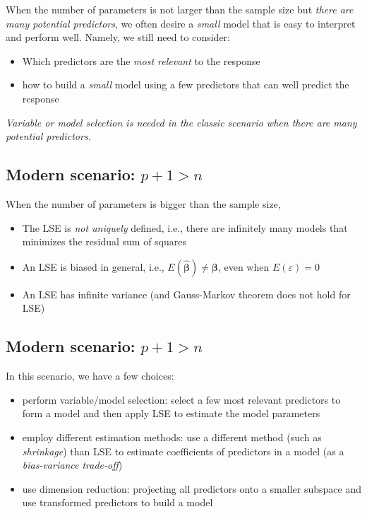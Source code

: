 \documentclass[]{article}
\providecommand{\tightlist}{%
  \setlength{\itemsep}{0pt}\setlength{\parskip}{0pt}}
\begin{document}
When the number of parameters is not larger than the sample size but
\emph{there are many potential predictors}, we often desire a
\emph{small} model that is easy to interpret and perform well. Namely,
we still need to consider:

\begin{itemize}
\tightlist
\item
  Which predictors are the \emph{most relevant} to the response
\item
  how to build a \emph{small} model using a few predictors that can well
  predict the response
\end{itemize}

\emph{Variable or model selection is needed in the classic scenario when
there are many potential predictors.}

\subsection{\texorpdfstring{Modern scenario:
\(p+1 > n\)}{Modern scenario: p+1 \textgreater{} n}}\label{modern-scenario-p1-n}

When the number of parameters is bigger than the sample size,

\begin{itemize}
\tightlist
\item
  The LSE is \emph{not uniquely} defined, i.e., there are infinitely
  many models that minimizes the residual sum of squares
\item
  An LSE is biased in general, i.e.,
  \(E(\hat{\boldsymbol{\beta}}) \ne {\boldsymbol{\beta}}\), even when
  \(E(\varepsilon)=0\)
\item
  An LSE has infinite variance (and Gauss-Markov theorem does not hold
  for LSE)
\end{itemize}

\subsection{\texorpdfstring{Modern scenario:
\(p+1 > n\)}{Modern scenario: p+1 \textgreater{} n}}\label{modern-scenario-p1-n-1}

In this scenario, we have a few choices:

\begin{itemize}
\tightlist
\item
  perform variable/model selection: select a few most relevant
  predictors to form a model and then apply LSE to estimate the model
  parameters
\item
  employ different estimation methods: use a different method (such as
  \emph{shrinkage}) than LSE to estimate coefficients of predictors in a
  model (as a \emph{bias-variance trade-off})
\item
  use dimension reduction: projecting all predictors onto a smaller
  subspace and use transformed predictors to build a model
\end{itemize}
\end{document}
